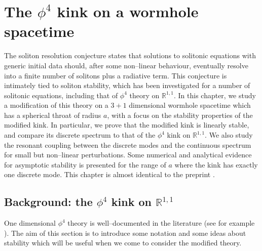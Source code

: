 \chapter{The $\phi^4$ kink on a wormhole spacetime} \label{chap:wormhole}


\graphicspath{{Chapter2/Figs/Static/}{Chapter2/Figs/Dynamic/}}



The soliton resolution conjecture \cite{TT} states that solutions to solitonic equations with generic initial data should, after some non--linear behaviour, eventually resolve into a finite number of solitons plus a radiative term. This conjecture is intimately tied to soliton stability, which has been investigated for a number of solitonic equations, including that of $\phi^4$ theory on $\mathbb{R}^{1,1}$. In this chapter, we study a modification of this theory on a $3+1$ dimensional wormhole spacetime which has a spherical throat of radius $a$, with a focus on the stability properties of the modified kink. In particular, we prove that the modified kink is linearly stable, and compare its discrete spectrum to that of the $\phi^4$ kink on $\mathbb{R}^{1,1}$. We also study the resonant coupling between the discrete modes and the continuous spectrum for small but non--linear perturbations. Some numerical and analytical evidence for asymptotic stability is presented for the range of $a$ where the kink has exactly one discrete mode. This chapter is almost identical to the preprint \cite{me}.

\section{Background: the $\phi^4$ kink on $\mathbb{R}^{1,1}$}

One dimensional $\phi^4$ theory is well--documented in the literature (see for example \cite{Manton&Sutcliffe}). The aim of this section is to introduce some notation and some ideas about stability which will be useful when we come to consider the modified theory.

